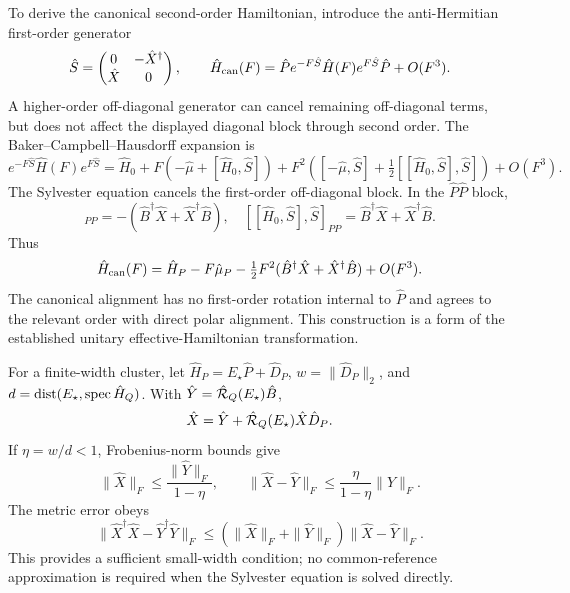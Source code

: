 \documentclass[aip,jcp,amsmath,amssymb,preprint,floatfix]{revtex4-1}
\begin{document}
To derive the canonical second-order Hamiltonian, introduce the anti-Hermitian first-order generator
\begin{equation}
\hat{S}=\begin{pmatrix}0&-\hat{X}^\dagger\\\hat{X}&0\end{pmatrix},
\qquad \hat{H}_{\rm can}(F)=\hat{P} e^{-F\hat{S}}\hat{H}(F)e^{F\hat{S}}\hat{P}+O(F^3).
\end{equation}
A higher-order off-diagonal generator can cancel remaining off-diagonal terms, but does not affect the displayed diagonal block through second order. The Baker--Campbell--Hausdorff expansion is
\begin{equation}
e^{-F\hat{S}}\hat{H}(F)e^{F\hat{S}}
=\hat{H}_0+F(-\hat{\mu}+[\hat{H}_0,\hat{S}])
+F^2\left([-\hat{\mu},\hat{S}]+\tfrac12[[\hat{H}_0,\hat{S}],\hat{S}]\right)+O(F^3).
\end{equation}
The Sylvester equation cancels the first-order off-diagonal block. In the $\hat{P}\hat{P}$ block,
\begin{equation}
[-\hat{\mu},\hat{S}]_{PP}=-(\hat{B}^\dagger \hat{X}+\hat{X}^\dagger \hat{B}),\quad
[[\hat{H}_0,\hat{S}],\hat{S}]_{PP}=\hat{B}^\dagger \hat{X}+\hat{X}^\dagger \hat{B}.
\end{equation}
Thus
\begin{equation}
\hat{H}_{\rm can}(F)=\hat{H}_P-F\hat{\mu}_P-\tfrac12F^2(\hat{B}^\dagger \hat{X}+\hat{X}^\dagger \hat{B})+O(F^3).
\end{equation}
The canonical alignment has no first-order rotation internal to $\hat{P}$ and agrees to the relevant order with direct polar alignment. This construction is a form of the established unitary effective-Hamiltonian transformation.\cite{Bravyi2011}

For a finite-width cluster, let $\hat{H}_P=E_\star \hat{P}+\hat{D}_P$, $w=\|\hat{D}_P\|_2$, and $d=\operatorname{dist}(E_\star,\operatorname{spec} \hat{H}_Q)$. With $\hat{Y}=\hat{\mathcal R}_Q(E_\star)\hat{B}$,
\begin{equation}
\hat{X}=\hat{Y}+\hat{\mathcal R}_Q(E_\star)\hat{X}\hat{D}_P .
\end{equation}
If $\eta=w/d<1$, Frobenius-norm bounds give
\begin{equation}
\|\hat{X}\|_F\le\frac{\|\hat{Y}\|_F}{1-\eta},\qquad
\|\hat{X}-\hat{Y}\|_F\le\frac{\eta}{1-\eta}\|\hat{Y}\|_F.
\end{equation}
The metric error obeys
\begin{equation}
\|\hat{X}^\dagger \hat{X}-\hat{Y}^\dagger \hat{Y}\|_F
\le(\|\hat{X}\|_F+\|\hat{Y}\|_F)\|\hat{X}-\hat{Y}\|_F.
\end{equation}
This provides a sufficient small-width condition; no common-reference approximation is required when the Sylvester equation is solved directly.
\end{document}
